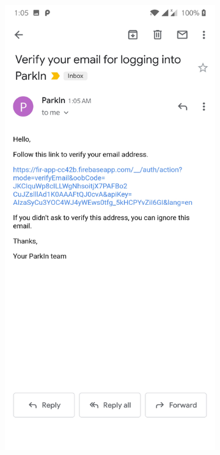 \documentclass[12pt, english]{article}
\begin{document}
\begin{figure}[h!]
    \centering
    \begin{subfigure}[t]{0.4\textwidth}
    \includegraphics[width=\linewidth]{Account_Creation/Verificationemailsenttoemailaddress.jpg}

\end{subfigure}
\end{figure}
\end{document}
